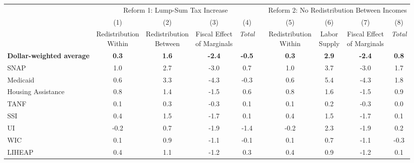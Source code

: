 \begin{tabular*}{1.38\textwidth}{@{\extracolsep{\fill}}lccccccccc}
  \toprule
  \addlinespace
                     & \multicolumn{4}{c}{Reform 1: Lump-Sum Tax Increase}                                  & \multicolumn{1}{l}{} & \multicolumn{4}{c}{Reform 2: No  Redistribution Between Incomes}        \\
\multicolumn{1}{c}{} & (1)                   & (2)                    & (3)                      & (4)            &                      & (5)                   & (6)          & (7)                      & (8)            \\
                     & \shortstack{Redistribution \\ Within} &
\shortstack{Redistribution \\ Between} & \shortstack{Fiscal Effect \\ of
  Marginals} & \textit{Total} &                      &
\shortstack{Redistribution \\ Within} & \shortstack{Labor \\ Supply} &
\shortstack{Fiscal Effect \\ of Marginals} & \textit{Total} \\
\cline{2-5} \cline{7-10}
\textbf{Dollar-weighted average} & \textbf{0.3}        & \textbf{1.6}         & \textbf{-2.4}             & \textbf{-0.5}  &                      & \textbf{0.3}        & \textbf{2.9} & \textbf{-2.4}             & \textbf{0.8}  \\

\addlinespace

SNAP                 & 1.0        & 2.7         & -3.0             & 0.7  &                      & 1.0        & 3.7 & -3.0             & 1.7  \\
Medicaid             & 0.6        & 3.3         & -4.3             & -0.3  &                      & 0.6        & 5.4 & -4.3             & 1.8  \\
Housing Assistance   & 0.8        & 1.4         & -1.5             & 0.6  &                      & 0.8        & 1.6 & -1.5             & 0.9  \\
TANF                 & 0.1        & 0.3         & -0.3             & 0.1  &                      & 0.1        & 0.2 & -0.3             & 0.0  \\
SSI                  & 0.4        & 1.5         & -1.7             & 0.1  &                      & 0.4        & 1.5 & -1.7             & 0.1  \\
UI                   & -0.2        & 0.7         & -1.9             & -1.4  &                      & -0.2        & 2.3 & -1.9             & 0.2  \\
WIC                  & 0.1        & 0.9         & -1.1             & -0.1  &                      & 0.1        & 0.7 & -1.1             & -0.3  \\
LIHEAP               & 0.4
& 1.1         & -1.2
& 0.3  &                      & 0.4
& 0.9 & -1.2             & 0.1
\\

\bottomrule 
\end{tabular*}
